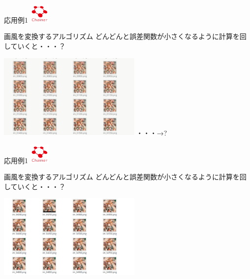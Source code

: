 \documentclass[12pt, unicode]{beamer}
\begin{document}
\begin{frame}{応用例1}
\includegraphics[clip,width=1.0cm]{image/chainer_logo.png}
\begin{block}{画風を変換するアルゴリズム}
どんどんと誤差関数が小さくなるように計算を回していくと・・・？
\end{block}
\includegraphics[clip,width=7.0cm]{image/Screenshot2.png}
・・・→\Large{?}
\end{frame}

\begin{frame}{応用例1}
\includegraphics[clip,width=1.0cm]{image/chainer_logo.png}
\begin{block}{画風を変換するアルゴリズム}
どんどんと誤差関数が小さくなるように計算を回していくと・・・？
\end{block}
\includegraphics[clip,width=7.0cm]{image/Screenshot3.png}
\end{frame}
\end{document}
